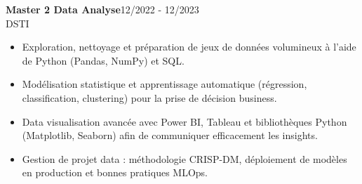 \documentclass{article}
\begin{document}
\begin{paracol}{2}
\vspace{3mm}

\colorbox{maincolor}{%
  \begin{minipage}{\linewidth}
    \noindent
    \textbf{Master 2 Data Analyse}\hfill 12/2022 - 12/2023\\
    DSTI\\[-0.3em]
    \begin{itemize}[leftmargin=*]
      \item Exploration, nettoyage et préparation de jeux de données volumineux à l'aide de Python (Pandas, NumPy) et SQL. \item Modélisation statistique et apprentissage automatique (régression, classification, clustering) pour la prise de décision business. \item Data visualisation avancée avec Power BI, Tableau et bibliothèques Python (Matplotlib, Seaborn) afin de communiquer efficacement les insights. \item Gestion de projet data : méthodologie CRISP-DM, déploiement de modèles en production et bonnes pratiques MLOps.
    \end{itemize}
  \end{minipage}}       %

\end{paracol}
\end{document}

